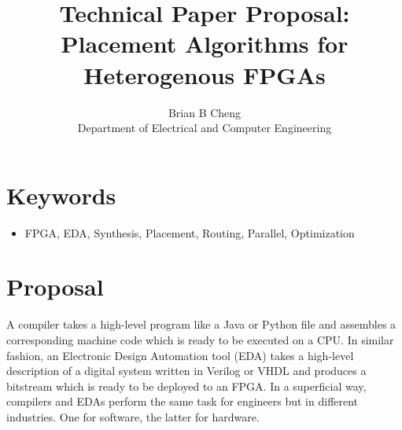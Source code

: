 \documentclass{article}
\begin{document}
\title{Technical Paper Proposal: \\ Placement Algorithms for Heterogenous FPGAs}
\author{Brian B Cheng \\ Department of Electrical and Computer Engineering}


\date{}
\maketitle

\section{Keywords}
\begin{itemize}
    \item FPGA, EDA, Synthesis, Placement, Routing, Parallel, Optimization
\end{itemize}


\section{Proposal}
A compiler takes a high-level program like a Java or Python file and assembles a corresponding machine code which is ready to be executed on a CPU.
In similar fashion, an Electronic Design Automation tool (EDA) takes a high-level description of a digital system written in Verilog or VHDL and produces a bitstream which is ready to be deployed to an FPGA.
In a superficial way, compilers and EDAs perform the same task for engineers but in different industries. 
One for software, the latter for hardware.

\end{document}
